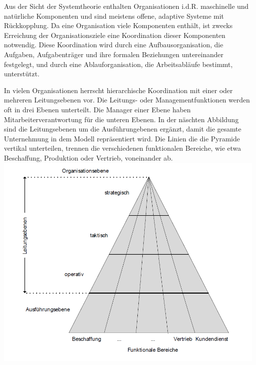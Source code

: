\documentclass[]{article}
\begin{document}
Aus der Sicht der Systemtheorie enthalten Organisationen i.d.R.
maschinelle und natürliche Komponenten und sind meistens offene,
adaptive Systeme mit Rückkopplung. Da eine Organisation viele
Komponenten enthält, ist zwecks Erreichung der Organisationsziele eine
Koordination dieser Komponenten notwendig. Diese Koordination wird durch
eine Aufbausorganisation, die Aufgaben, Aufgabenträger und ihre formalen
Beziehungen untereinander festgelegt, und durch eine Ablauforganisation,
die Arbeitsabläufe bestimmt, unterstützt.

In vielen Organisationen herrscht hierarchische Koordination mit einer
oder mehreren Leitungsebenen vor. Die Leitungs- oder
Managementfunktionen werden oft in drei Ebenen unterteilt. Die Manager
einer Ebene haben Mitarbeiterverantwortung für die unteren Ebenen. In
der näschten Abbildung sind die Leitungsebenen um die Ausführungebenen
ergänzt, damit die gesamte Unternehmung in dem Modell repräsentiert
wird. Die Linien die die Pyramide vertikal unterteilen, trennen die
verschiedenen funktionalen Bereiche, wie etwa Beschaffung, Produktion
oder Vertrieb, voneinander ab. \includegraphics{img/orgaeben.png}
\end{document}
